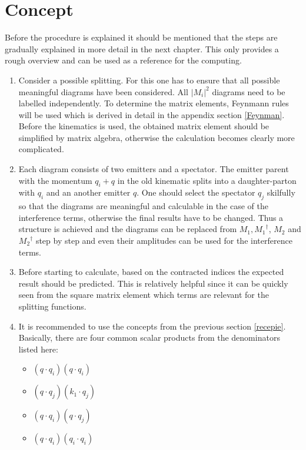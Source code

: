 \section*{Concept}
\label{Concept}

Before the procedure is explained it should be mentioned that the steps are gradually explained in more detail in the next chapter. This only provides a rough overview and can be used as a reference for the computing.
\\
\renewcommand{\labelenumi}{\roman{enumi})}
\begin{enumerate}
\item Consider a possible splitting. For this one has to ensure that all possible meaningful diagrams have been considered.
All $ |M_i|^2 $ diagrams need to be labelled independently.  To determine the matrix elements, Feynmann rules will be used which is derived in detail in the appendix section \ref{Feynman}. Before the kinematics is used, the obtained matrix element should be simplified by matrix algebra, otherwise the calculation becomes clearly more complicated.
\\
\item Each diagram consists of two emitters and a spectator.
The emitter parent with the momentum $ q_i+q $ in the old kinematic splits into a daughter-parton with $ q_i $ and an another emitter $ q $. One should select the spectator $ q_j $ skilfully so that the diagrams are meaningful and calculable in the case of the interference terms, otherwise the final results have to be changed. Thus a structure is achieved and the diagrams can be replaced from $ M_1, {M_1}^{\dagger}$,  $ M_2 $ and ${M_2}^{\dagger}$ step by step and even their amplitudes can be used for the interference terms. 
\\
\item Before starting to calculate, based on the contracted indices the expected result should be predicted. This is relatively helpful since it can be quickly seen from the square matrix element which terms are relevant for the splitting functions.
\\
\item It is recommended to use the concepts from the previous section \ref{recepie}. Basically, there are four common scalar products from the denominators listed here:

\begin{itemize}
\item $ (q \cdot q_i)(q \cdot q_i) $
\item $ (q \cdot q_j)(k_1 \cdot q_j) $
\item $ (q \cdot q_i)(q \cdot q_j) $
\item $ (q \cdot q_i)(q_i \cdot q_i) $
\end{itemize}


\end{enumerate}
